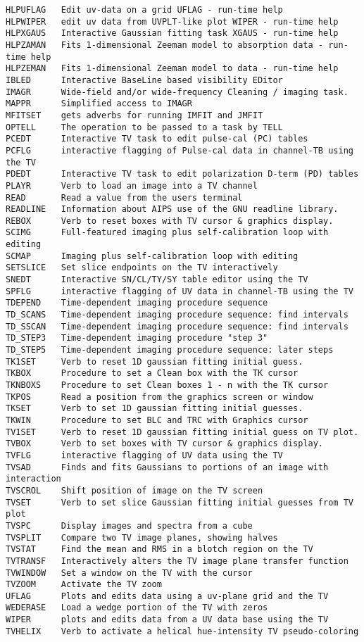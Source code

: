 \begin{verbatim}
HLPUFLAG   Edit uv-data on a grid UFLAG - run-time help
HLPWIPER   edit uv data from UVPLT-like plot WIPER - run-time help
HLPXGAUS   Interactive Gaussian fitting task XGAUS - run-time help
HLPZAMAN   Fits 1-dimensional Zeeman model to absorption data - run-time help
HLPZEMAN   Fits 1-dimensional Zeeman model to data - run-time help
IBLED      Interactive BaseLine based visibility EDitor
IMAGR      Wide-field and/or wide-frequency Cleaning / imaging task.
MAPPR      Simplified access to IMAGR
MFITSET    gets adverbs for running IMFIT and JMFIT
OPTELL     The operation to be passed to a task by TELL
PCEDT      Interactive TV task to edit pulse-cal (PC) tables
PCFLG      interactive flagging of Pulse-cal data in channel-TB using the TV
PDEDT      Interactive TV task to edit polarization D-term (PD) tables
PLAYR      Verb to load an image into a TV channel
READ       Read a value from the users terminal
READLINE   Information about AIPS use of the GNU readline library.
REBOX      Verb to reset boxes with TV cursor & graphics display.
SCIMG      Full-featured imaging plus self-calibration loop with editing
SCMAP      Imaging plus self-calibration loop with editing
SETSLICE   Set slice endpoints on the TV interactively
SNEDT      Interactive SN/CL/TY/SY table editor using the TV
SPFLG      interactive flagging of UV data in channel-TB using the TV
TDEPEND    Time-dependent imaging procedure sequence
TD_SCANS   Time-dependent imaging procedure sequence: find intervals
TD_SSCAN   Time-dependent imaging procedure sequence: find intervals
TD_STEP3   Time-dependent imaging procedure "step 3"
TD_STEP5   Time-dependent imaging procedure sequence: later steps
TK1SET     Verb to reset 1D gaussian fitting initial guess.
TKBOX      Procedure to set a Clean box with the TK cursor
TKNBOXS    Procedure to set Clean boxes 1 - n with the TK cursor
TKPOS      Read a position from the graphics screen or window
TKSET      Verb to set 1D gaussian fitting initial guesses.
TKWIN      Procedure to set BLC and TRC with Graphics cursor
TV1SET     Verb to reset 1D gaussian fitting initial guess on TV plot.
TVBOX      Verb to set boxes with TV cursor & graphics display.
TVFLG      interactive flagging of UV data using the TV
TVSAD      Finds and fits Gaussians to portions of an image with interaction
TVSCROL    Shift position of image on the TV screen
TVSET      Verb to set slice Gaussian fitting initial guesses from TV plot
TVSPC      Display images and spectra from a cube
TVSPLIT    Compare two TV image planes, showing halves
TVSTAT     Find the mean and RMS in a blotch region on the TV
TVTRANSF   Interactively alters the TV image plane transfer function
TVWINDOW   Set a window on the TV with the cursor
TVZOOM     Activate the TV zoom
UFLAG      Plots and edits data using a uv-plane grid and the TV
WEDERASE   Load a wedge portion of the TV with zeros
WIPER      plots and edits data from a UV data base using the TV
TVHELIX    Verb to activate a helical hue-intensity TV pseudo-coloring
\end{verbatim}\eve

